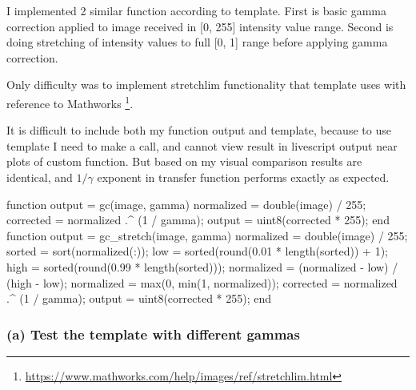 I implemented 2 similar function according to template. First is basic gamma correction applied to image received in [0, 255] intensity value range. Second is doing stretching of intensity values to full [0, 1] range before applying gamma correction. 

Only difficulty was to implement stretchlim functionality that template uses with reference to Mathworks \footnote{\url{https://www.mathworks.com/help/images/ref/stretchlim.html}}. 

It is difficult to include both my function output and template, because to use template I need to make a call, and cannot view result in livescript output near plots of custom function. But based on my visual comparison results are identical, and $1/\gamma$ exponent in transfer function performs exactly as expected.

\codeused
\begin{matlab}
function output = gc(image, gamma)
    normalized = double(image) / 255;
    corrected = normalized .^ (1 / gamma);
    output = uint8(corrected * 255);
end
function output = gc_stretch(image, gamma)
    normalized = double(image) / 255;
    sorted = sort(normalized(:));
    low = sorted(round(0.01 * length(sorted)) + 1);
    high = sorted(round(0.99 * length(sorted)));
    normalized = (normalized - low) / (high - low);
    normalized = max(0, min(1, normalized));
    corrected = normalized .^ (1 / gamma);
    output = uint8(corrected * 255);
end
\end{matlab}

\subsubsection{(a) Test the template with different gammas}

